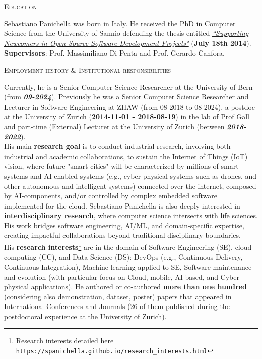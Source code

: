 \documentclass[11pt]{article}
\providecommand*\url[1]{\href{#1}{#1}}
\renewcommand*\url[1]{\href{#1}{\texttt{#1}}}
\begin{document}
\vspace{2.5mm}
\textsc{Education}
\vspace{1.5mm}

Sebastiano Panichella was born in Italy.
He received the PhD in Computer Science from the University of Sannio 
 defending the thesis entitled  \href{http://dx.doi.org/10.1109/ICSM.2015.7332519}{\textit{``Supporting Newcomers in Open Source Software Development Projects"}} (\textbf{July 18th 2014}). \textbf{Supervisors}: Prof. Massimiliano  Di Penta and Prof. Gerardo Canfora.

\vspace{2.5mm}
\textsc{Employment history \& Institutional responsibilities}
\vspace{1.5mm}


Currently, he is a Senior Computer Science Researcher at the University of Bern (from \textit{\textbf{09-2024}}). Previously he was a Senior Computer Science Researcher and Lecturer in Software Engineering at ZHAW (from 08-2018 to 08-2024), a postdoc at the University of Zurich (\textbf{2014-11-01 - 2018-08-19}) in the lab of Prof Gall and part-time (External) Lecturer at the University of Zurich (between \textit{\textbf{2018-2022}}). \\
His main \textbf{research goal} is to conduct industrial research, involving both industrial and academic collaborations, to sustain the Internet of Things (IoT) vision, where future "smart cities" will be characterized by millions of smart systems and AI-enabled systems (e.g., cyber-physical systems such as drones, and other autonomous and intelligent systems) connected over the internet, composed by AI-components, and/or controlled by complex embedded software implemented for the cloud.
Sebastiano Panichella is also deeply interested in \textbf{interdisciplinary research}, where computer science intersects with life sciences. His work bridges software engineering, AI/ML, and domain-specific expertise, creating impactful collaborations beyond traditional disciplinary boundaries.
\\
His  \textbf{research interests}\footnote{ Research interests detailed here \url{https://spanichella.github.io/research\_interests.html}} are in the domain of Software Engineering (SE), cloud computing (CC), and Data Science (DS): DevOps (e.g., Continuous Delivery, Continuous Integration), Machine learning applied to SE, Software maintenance and evolution (with particular focus on Cloud, mobile, AI-based, and Cyber-physical applications). 
He authored or co-authored \textbf{more than one hundred} (considering also demonstration, dataset, poster) papers that appeared in International Conferences and Journals (26 of them published during the postdoctoral experience at the University of Zurich).
 
\end{document}
